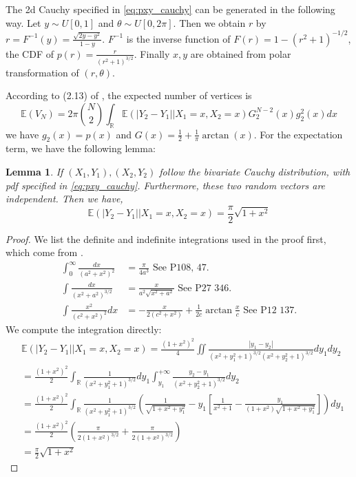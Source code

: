 \documentclass{article}
\newtheorem{lemma}{Lemma}
\def\E{\mathbb{E}}
\def\R{\mathbb{R}}
\begin{document}
The 2d Cauchy specified in
\eqref{eq:pxy_cauchy} can be generated in the following way.
Let $y \sim U[0,1]$ and $\theta \sim
U[0, 2\pi]$. Then we obtain $r$
by $r=F^{-1}(y) = \frac{\sqrt{2y-y^2}}{1-y}$.
$F^{-1}$ is the inverse function
of $F(r)=1-(r^2+1)^{-1/2}$, the CDF of
$p(r)= \frac{r}{(r^2+1)^{3/2}}$.
Finally $x,y$ are obtained from polar transformation
of $(r,\theta)$.


According to (2.13) of \cite{efron1965convex},
the expected number of vertices is
\begin{equation}\label{eq:general_2d}
    \E(V_N) = 2\pi \binom{N}{2}
    \int_{\R}\E(|Y_2-Y_1| \Big\vert X_1= x, X_2=x)
    G^{N-2}_2(x) g^2_2(x)dx
\end{equation}
we have $g_2(x) = p(x)$ and $G(x)=\frac{1}{2}+ \frac{1}{\pi}\arctan(x)$.
For the expectation term, we have the following lemma:
\begin{lemma}
    If $(X_1, Y_1), (X_2, Y_2)$ follow the bivariate Cauchy
    distribution, with pdf specified in \eqref{eq:pxy_cauchy}.
    Furthermore, these two random vectors are independent.
    Then we have,
    \begin{equation}\label{eq:cauchy_conditional_expectation}
        \E(|Y_2-Y_1| \Big\vert X_1= x, X_2=x)
        = \frac{\pi}{2}\sqrt{1+x^2}
    \end{equation}
\end{lemma}
\begin{proof}
We list the definite and indefinite integrations
used in the proof first, which come from \cite{integration}.
\begin{align}
    \int_0^{\infty} \frac{dx}{(a^2+x^2)^2}
    & = \frac{\pi}{4a^3} \textrm{ See P108, 47. } \\
    \int \frac{dx}{(x^2+a^2)^{3/2}}
    & = \frac{x}{a^2\sqrt{x^2+a^2}}
    \textrm{ See P27 346.}
    \label{eq:indefinite_inverse_32}\\
    \int \frac{x^2}{(c^2+x^2)^2}dx
    &=-\frac{x}{2(c^2+x^2)}
    +\frac{1}{2c}\arctan\frac{x}{c}
    \textrm{ See P12 137.}
\end{align}
We compute the integration directly:
\begin{align*}
    &\E\left(|Y_2-Y_1| \Big\vert X_1= x, X_2=x\right)
        =\frac{(1+x^2)^2}{4}\iint \frac{|y_1-y_2|}
        {(x^2+y_1^2+1)^{3/2}(x^2+y_2^2+1)^{3/2}}dy_1dy_2\\
        &=\frac{(1+x^2)^2}{2}\int_{\R}\frac{1}{(x^2+y_1^2+1)^{3/2}}
        dy_1\int_{y_1}^{+\infty}\frac{y_2-y_1}
        {(x^2+y_2^2+1)^{3/2}}dy_2 \\
        &=\frac{(1+x^2)^2}{2}\int_{\R}\frac{1}{(x^2+y_1^2+1)^{3/2}}
        \left(\frac{1}{\sqrt{1+x^2+y_1^2}}-y_1\left[\frac{1}{x^2+1}
        -\frac{y_1}{(1+x^2)\sqrt{1+x^2+y_1^2}}\right]\right)dy_1\\
        &=\frac{(1+x^2)^2}{2} \left(\frac{\pi}{2(1+x^2)^{3/2}}
        +\frac{\pi}{2(1+x^2)^{3/2}}\right)\\
        &=\frac{\pi}{2}\sqrt{1+x^2}
\end{align*}
\end{proof}
\end{document}
